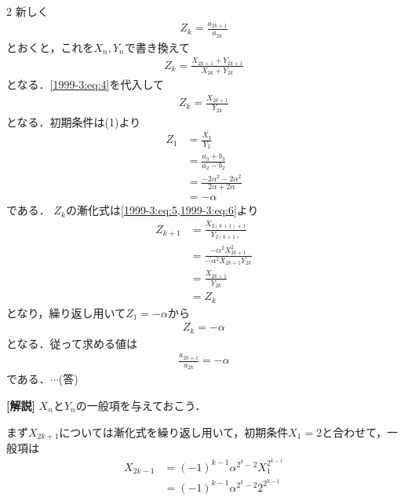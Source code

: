 \documentclass[../../../../main.tex]{subfiles}
\begin{document}
\begin{multicols}{2}
    新しく
    \begin{align*}
        Z_{k} = \frac{a_{2k+1}}{a_{2k}}
    \end{align*}
    とおくと，これを$X_n,Y_n$で書き換えて
    \begin{align*}
        Z_{k} = \frac{X_{2k+1}+Y_{2k+1}}{X_{2k}+Y_{2k}}
    \end{align*}
    となる．\cref{1999-3:eq:4}を代入して
    \begin{align*}
        Z_{k} = \frac{X_{2k+1}}{Y_{2k}}
    \end{align*}
    となる．初期条件は(1)より
    \begin{align*}
        Z_{1}
         & = \frac{X_{3}}{Y_{2}}                          \\
         & = \frac{a_{3}+b_{3}}{a_{2}-b_{2}}              \\
         & = \frac{-2\alpha^2-2\alpha^2}{2\alpha+2\alpha} \\
         & = -\alpha
    \end{align*}
    である．
    $Z_{k}$の漸化式は\cref{1999-3:eq:5,1999-3:eq:6}より
    \begin{align*}
        Z_{k+1}
         & = \frac{X_{2(k+1)+1}}{Y_{2(k+1)}}                        \\
         & = \frac{-\alpha^2 X^2_{2k+1}}{- \alpha^2 X_{2k+1}Y_{2k}} \\
         & = \frac{X_{2k+1}}{Y_{2k}}                                \\
         & = Z_{k}
    \end{align*}
    となり，繰り返し用いて$Z_{1}=-\alpha$から
    \begin{align*}
        Z_{k} = -\alpha
    \end{align*}
    となる．従って求める値は
    \begin{align*}
        \frac{a_{2k+1}}{a_{2k}} = -\alpha
    \end{align*}
    である．$\cdots$(答)

    \vspace{10pt}
    {\bf[解説]}
    $X_n$と$Y_n$の一般項を与えておこう．

    まず$X_{2k+1}$については漸化式を繰り返し用いて，初期条件$X_1=2$と合わせて，一般項は
    \begin{align*}
        X_{2k-1}
         & = (-1)^{k-1}\alpha^{2^k-2}X_1^{2^{k-1}} \\
         & = (-1)^{k-1}\alpha^{2^k-2}2^{2^{k-1}}
    \end{align*}


    \newpage
\end{multicols}
\end{document}
